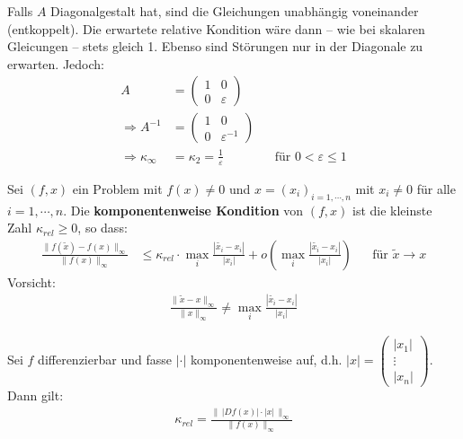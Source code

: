 \begin{Bspe}
  Falls $A$ Diagonalgestalt hat, sind die Gleichungen unabhängig voneinander (entkoppelt).
  Die erwartete relative Kondition wäre dann -- wie bei skalaren Gleicungen -- stets gleich 1.
  Ebenso sind Störungen nur in der Diagonale zu erwarten. Jedoch:
  \begin{align*}
    A  &=\begin{pmatrix}
      1 & 0\\
      0 & \varepsilon
    \end{pmatrix} \\
    \Rightarrow 	A^{-1}&=\begin{pmatrix}
      1 & 0\\
      0 & \varepsilon^{-1}
    \end{pmatrix}\\
    \Rightarrow \kappa_\infty& = \kappa_2 = \frac{1}{\varepsilon} 
        && \text{für }0 < \varepsilon \leq 1											
  \end{align*}
\end{Bspe}

\begin{Defe}
  Sei $(f, x) $ ein Problem mit $f(x)\neq 0$ und $x=(x_i)_{i=1,\cdots , n}$ mit $x_i\neq 0 $  für alle $i=1,\cdots, n$.
  Die \textbf{komponentenweise Kondition} von $(f,x) $ ist die kleinste Zahl $\kappa_{rel}\geq 0$, so dass:
  \begin{align*}
    \frac{\|f(\widetilde{x})-f(x)\|_\infty}{\|f(x)\|_\infty} 
    &\leq \kappa_{rel} \cdot \underset{i}{\max}\frac{|\widetilde{x_i}-x_i|}{|x_i|}+ o\left(\underset{i}{\max}\frac{|\widetilde{x_i}-x_i|}{|x_i|}\right) 
    && \text{für }\widetilde{x}\rightarrow x
  \end{align*}
  Vorsicht:
  \begin{gather*}
    \frac{\|\widetilde{x}-x\|_\infty}{\|x\|_\infty}\neq \underset{i}{\max}\frac{|\widetilde{x_i}-x_i|}{|x_i|}
  \end{gather*}
\end{Defe}

\begin{Leme}
  \label{3.2.17}
  Sei $f$ differenzierbar und fasse $|\cdot|$ komponentenweise auf, d.h. $|x| = \begin{pmatrix}
    |x_1| \\
    \vdots \\
    |x_n|
  \end{pmatrix}$.
  Dann gilt:
  \begin{gather}
    \kappa_{rel} = \frac{\|\, |Df(x)|\cdot |x| \, \|_\infty}{\|f(x)\|_\infty} \label{III.2.16}
  \end{gather}
\end{Leme}

